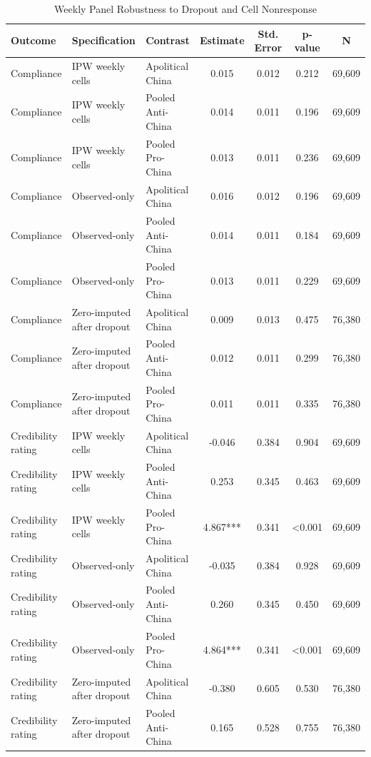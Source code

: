\begin{table}[H]
\centering
\caption{Weekly Panel Robustness to Dropout and Cell Nonresponse}
\label{tab:weekly_selection_robustness}
\footnotesize
\begin{threeparttable}
\begin{tabular}{lllcccc}
\toprule
Outcome & Specification & Contrast & Estimate & Std. Error & p-value & N \\
\midrule
Compliance & IPW weekly cells & Apolitical China & 0.015 & 0.012 & 0.212 & 69,609 \\
Compliance & IPW weekly cells & Pooled Anti-China & 0.014 & 0.011 & 0.196 & 69,609 \\
Compliance & IPW weekly cells & Pooled Pro-China & 0.013 & 0.011 & 0.236 & 69,609 \\
Compliance & Observed-only & Apolitical China & 0.016 & 0.012 & 0.196 & 69,609 \\
Compliance & Observed-only & Pooled Anti-China & 0.014 & 0.011 & 0.184 & 69,609 \\
Compliance & Observed-only & Pooled Pro-China & 0.013 & 0.011 & 0.229 & 69,609 \\
Compliance & Zero-imputed after dropout & Apolitical China & 0.009 & 0.013 & 0.475 & 76,380 \\
Compliance & Zero-imputed after dropout & Pooled Anti-China & 0.012 & 0.011 & 0.299 & 76,380 \\
Compliance & Zero-imputed after dropout & Pooled Pro-China & 0.011 & 0.011 & 0.335 & 76,380 \\
Credibility rating & IPW weekly cells & Apolitical China & -0.046 & 0.384 & 0.904 & 69,609 \\
Credibility rating & IPW weekly cells & Pooled Anti-China & 0.253 & 0.345 & 0.463 & 69,609 \\
Credibility rating & IPW weekly cells & Pooled Pro-China & 4.867*** & 0.341 & <0.001 & 69,609 \\
Credibility rating & Observed-only & Apolitical China & -0.035 & 0.384 & 0.928 & 69,609 \\
Credibility rating & Observed-only & Pooled Anti-China & 0.260 & 0.345 & 0.450 & 69,609 \\
Credibility rating & Observed-only & Pooled Pro-China & 4.864*** & 0.341 & <0.001 & 69,609 \\
Credibility rating & Zero-imputed after dropout & Apolitical China & -0.380 & 0.605 & 0.530 & 76,380 \\
Credibility rating & Zero-imputed after dropout & Pooled Anti-China & 0.165 & 0.528 & 0.755 & 76,380 \\

\end{tabular}
\end{threeparttable}
\end{table}
